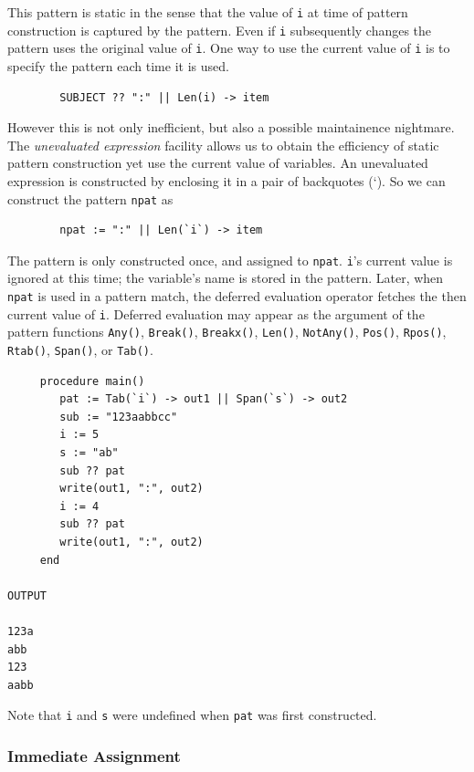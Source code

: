 \documentclass[letterpaper,12pt]{article}
\begin{document}
This pattern is static in the sense that the value of {\tt i} at
time of pattern construction is captured by the pattern. Even if
\texttt{i} subsequently changes the pattern uses the original value of
\texttt{i}. One way to use the current value of \texttt{i} is to
specify the pattern each time it is used.

\begin{verbatim}
        SUBJECT ?? ":" || Len(i) -> item
\end{verbatim}

However this is not only inefficient, but also a possible maintainence
nightmare. The {\em unevaluated expression\/} facility allows us to obtain
the efficiency of static pattern construction yet use the current
value of variables. An unevaluated expression is constructed by
enclosing it in a pair of backquotes (`). So we can construct the pattern
\texttt{npat} as

\begin{verbatim}
        npat := ":" || Len(`i`) -> item
\end{verbatim}

The pattern is only constructed once, and assigned to
\texttt{npat}. \texttt{i}'s current value is ignored at this
time; the variable's name is stored in the pattern.
Later, when \texttt{npat} is used in a pattern match, the
deferred evaluation operator fetches the then current value of
\texttt{i}. Deferred evaluation may appear as the argument of the
pattern functions {\tt Any()}, {\tt Break()}, {\tt Breakx()}, {\tt Len()},
{\tt NotAny()}, {\tt Pos()}, {\tt Rpos()}, {\tt Rtab()}, {\tt Span()},
or {\tt Tab()}.

\begin{verbatim}
     procedure main()
        pat := Tab(`i`) -> out1 || Span(`s`) -> out2
        sub := "123aabbcc"
        i := 5
        s := "ab"
        sub ?? pat
        write(out1, ":", out2)
        i := 4
        sub ?? pat
        write(out1, ":", out2)
     end

OUTPUT

123a
abb
123
aabb
\end{verbatim}

\noindent Note that \texttt{i} and \texttt{s} were undefined when \texttt{pat}
was first constructed.

\subsubsection{Immediate Assignment}
\end{document}
